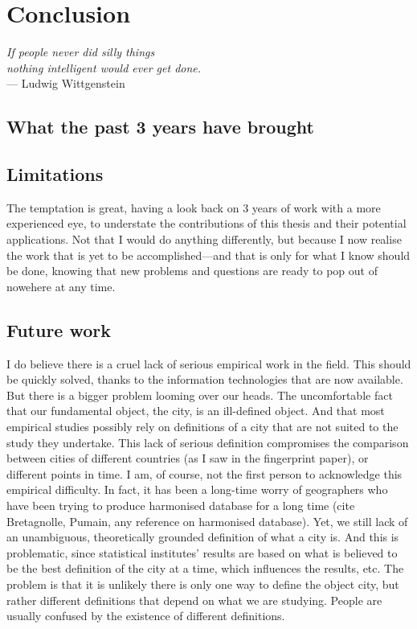 %
\chapter{Conclusion}
\label{sec:conclusion}

\begin{flushright}{\slshape    
If people never did silly things\\
nothing intelligent would ever get done.} \\ \medskip
--- Ludwig Wittgenstein 
\end{flushright}


\section{What the past 3 years have brought}
\label{sec:what_the_past_3_years_have_brought}



\section{Limitations}
\label{sec:limitations}


The temptation is great, having a look back on $3$ years of work with a more
experienced eye, to understate the contributions of this thesis and their
potential applications. Not that I would do anything differently, but because I
now realise the work that is yet to be accomplished---and that is only for what
I know should be done, knowing that new problems and questions are ready to pop
out of nowehere at any time.

\section{Future work}
\label{sec:future_work}

I do believe there is a cruel lack of serious empirical work in the field. This
should be quickly solved, thanks to the information technologies that are now
available. But there is a bigger problem looming over our heads. The
uncomfortable fact that our fundamental object, the city, is an ill-defined
object. And that most empirical studies possibly rely on definitions of a city
that are not suited to the study they undertake. 
This lack of serious definition compromises the comparison between cities of
different countries (as I saw in the fingerprint paper), or different points in
time. I am, of course, not the first person to acknowledge this empirical
difficulty. In fact, it has been a long-time worry of geographers who have been
trying to produce harmonised database for a long time (cite
Bretagnolle, Pumain, any reference on harmonised database). Yet, we still lack
of an unambiguous, theoretically grounded definition of what a city is. And this
is problematic, since statistical institutes' results are based on what is
believed to be the best definition of the city at a time, which influences the
results, etc.
The problem is that it is unlikely there is only one way to define the object
city, but rather different definitions that depend on what we are studying.
People are usually confused by the existence of different definitions.


